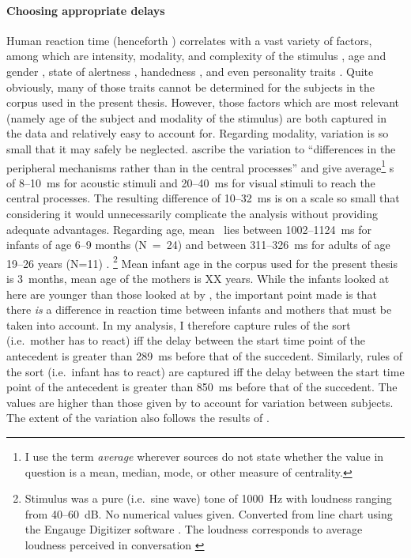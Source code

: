 \paragraph{Choosing appropriate delays}  %
Human reaction time (henceforth \rt) correlates with a vast variety of factors, among which are intensity, modality, and complexity of the stimulus \citep{brebner80}, age and gender \citep{der06}, state of alertness \citep{appelle74}, handedness \citep{dane03}, and even personality traits \citep{stelmack93}. Quite obviously, many of those traits cannot be determined for the subjects in the corpus used in the present thesis. However, those factors which are most relevant (namely age of the subject and modality of the stimulus) are both captured in the data and relatively easy to account for. Regarding modality, variation is so small that it may safely be neglected. \citet[]{brebner80} ascribe the variation to ``differences in the peripheral mechanisms rather than in the central processes'' and give average\footnote{I use the term \emph{average} wherever sources do not state whether the value in question is a mean, median, mode, or other measure of centrality.} \rt s of 8--10~ms for acoustic stimuli and 20--40~ms for visual stimuli to reach the central processes. The resulting difference of 10--32~ms is on a scale so small that considering it would unnecessarily complicate the analysis without providing adequate advantages. Regarding age, mean \rt\ lies  between 1002--1124~ms for infants of age 6--9 months (N~=~24) and between 311--326~ms for adults of age 19--26 years (N=11) \citep[]{leibold02}.%
\footnote{Stimulus was a pure (i.e.~sine wave) tone of 1000~Hz with loudness ranging from 40--60~dB. No numerical values given. Converted from line chart using the Engauge Digitizer software \citep{mitchell02}. The loudness corresponds to average loudness perceived in conversation \citep[]{goerne06}} 
Mean infant age in the corpus used for the present thesis is 3~months, mean age of the mothers is XX years. While the infants looked at here are younger than those looked at by \citet{leibold02}, the important point made is that there \emph{is} a difference in reaction time between infants and mothers that must be taken into account. In my analysis, I therefore capture rules of the sort  (i.e.~mother has to react) iff the delay between the start time point of the antecedent is greater than 289~ms before that of the succedent. Similarly, rules of the sort  (i.e.~infant has to react) are captured iff the delay between the start time point of the antecedent is greater than 850~ms before that of the succedent. The values are higher than those given by \citet{leibold02} to account for variation between subjects. The extent of the variation also follows the results of \citet{leibold02}.

